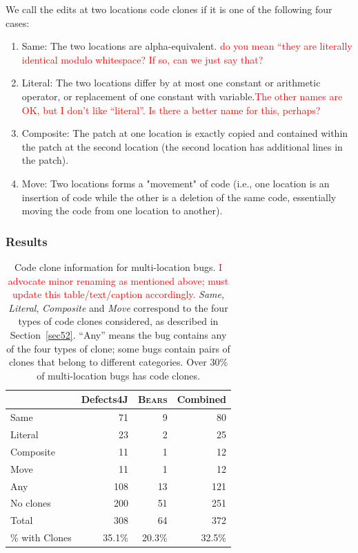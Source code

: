 \documentclass[10pt, conference]{IEEEtran}
\newcommand\todo[1]{\textcolor{red}{#1}}
\newcommand\bears{\textsc{Bears}\xspace}
\begin{document}
We call the edits at two locations code clones if it is one of the following four cases:
\begin{enumerate}
\item Same: The two locations are alpha-equivalent. \todo{do you mean ``they are
    literally identical modulo whitespace?  If so, can we just say that?}
\item Literal: The two locations differ by at most one constant or arithmetic operator,
or replacement of one constant with variable.\todo{The other names are OK, but I
  don't like ``literal''.  Is there a better name for this, perhaps?}
\item Composite: The patch at one location is exactly copied and contained within the patch at 
the 
second location (the second location  has additional lines in the patch).
\item Move: Two locations forms a "movement" of code (i.e., one location is an insertion of 
code 
while the other is a deletion of the same code, essentially moving the code from one location to 
another).
\end{enumerate}

\subsubsection{Results}

\begin{table}
{\begin{center}
\begin{tabular} {lrrr}
\toprule
& Defects4J & \bears & Combined \\
\midrule
Same & 71 & 9 & 80  \\ 
Literal & 23 & 2 & 25  \\
Composite & 11 & 1 & 12  \\
Move & 11 & 1 & 12  \\
\midrule
Any & 108 & 13 & 121  \\
No clones & 200  &  51 & 251 \\
Total & 308 & 64 & 372 \\
\% with Clones & 35.1\% & 20.3\% & 32.5\% \\
\bottomrule
\end{tabular}
\end{center}
}
\caption{Code clone information for multi-location bugs. \todo{I advocate minor
    renaming as mentioned above; must update this table/text/caption accordingly.}
     \emph{Same}, \emph{Literal}, \emph{Composite} and \emph{Move} correspond to the
    four types of code clones considered, as described in Section~\ref{sec52}. ``Any'' means the bug
    contains any of the four types of clone; some bugs contain
    pairs of clones that belong to different categories. 
    Over
    30\% of multi-location bugs has code clones.}
\label{tab:clones}
\end{table}
\end{document}
